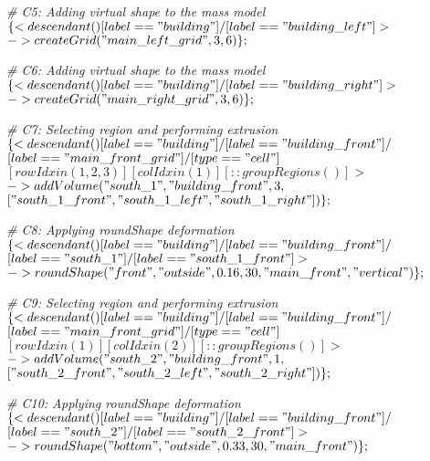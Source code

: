 \noindent \textit{\# C5: Adding virtual shape to the mass model}\\
$\{< descendant() [label=="building"] / [label=="building\_left"] > $\\
$-> createGrid("main\_left\_grid", 3, 6)\};$

\noindent \textit{\# C6: Adding virtual shape to the mass model}\\
$\{< descendant() [label=="building"] / [label=="building\_right"] > $\\
$-> createGrid("main\_right\_grid", 3, 6)\};$

\noindent \textit{\# C7: Selecting region and performing extrusion}\\
$\{< descendant() [label=="building"] / [label=="building\_front"] / $\\
$[label=="main\_front\_grid"] / [type=="cell"] $\\
$[rowIdx in (1, 2, 3)] [colIdx in (1)] [::groupRegions()] > $\\
$-> addVolume("south\_1", "building\_front", 3, $\\
$["south\_1\_front", "south\_1\_left", "south\_1\_right"])\};$

\noindent \textit{\# C8: Applying roundShape deformation}\\
$\{< descendant() [label=="building"] / [label=="building\_front"] / $\\
$[label=="south\_1"] / [label=="south\_1\_front"] > $\\
$-> roundShape("front", "outside", 0.16, 30, "main\_front", "vertical")\};$

\noindent \textit{\# C9: Selecting region and performing extrusion}\\
$\{< descendant() [label=="building"] / [label=="building\_front"] / $\\
$[label=="main\_front\_grid"] / [type=="cell"] $\\
$[rowIdx in (1)] [colIdx in (2)] [::groupRegions()] > $\\
$-> addVolume("south\_2", "building\_front", 1, $\\
$["south\_2\_front", "south\_2\_left", "south\_2\_right"])\};$

\noindent \textit{\# C10: Applying roundShape deformation}\\
$\{< descendant() [label=="building"] / [label=="building\_front"] / $\\
$[label=="south\_2"] / [label=="south\_2\_front"] > $\\
$-> roundShape("bottom", "outside", 0.33, 30, "main\_front")\};$

